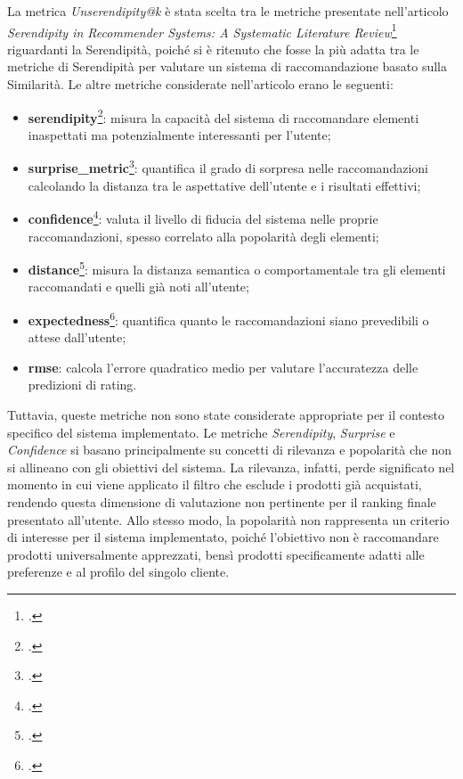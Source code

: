 La metrica \emph{Unserendipity@k} è stata scelta tra le metriche presentate nell'articolo \emph{Serendipity in Recommender Systems: A Systematic Literature Review}\footcite{article:serendipity-recommender-systems} riguardanti la Serendipità, poiché si è ritenuto che fosse la più adatta tra le metriche di Serendipità per valutare un sistema di raccomandazione basato sulla Similarità.
Le altre metriche considerate nell'articolo erano le seguenti:
\begin{itemize}
    \item \textbf{\gls{serendipity}}\footcite{site:serendipity_metric}: misura la capacità del sistema di raccomandare elementi inaspettati ma potenzialmente interessanti per l'utente;
    \item \textbf{\gls{surprise_metric}}\footcite{article:surprise_metric}: quantifica il grado di sorpresa nelle raccomandazioni calcolando la distanza tra le aspettative dell'utente e i risultati effettivi;
    \item \textbf{\gls{confidence}}\footcite{article:confidence_metric}: valuta il livello di fiducia del sistema nelle proprie raccomandazioni, spesso correlato alla popolarità degli elementi;
    \item \textbf{\gls{distance}}\footcite{site:distance_measures}: misura la distanza semantica o comportamentale tra gli elementi raccomandati e quelli già noti all'utente;
    \item \textbf{\gls{expectedness}}\footcite{article:expectedness}: quantifica quanto le raccomandazioni siano prevedibili o attese dall'utente;
    \item \textbf{\gls{rmse}}: calcola l'errore quadratico medio per valutare l'accuratezza delle predizioni di rating.
\end{itemize}

Tuttavia, queste metriche non sono state considerate appropriate per il contesto specifico del sistema implementato. Le metriche \emph{Serendipity}, \emph{Surprise} e \emph{Confidence} si basano principalmente su concetti di rilevanza e popolarità che non si allineano con gli obiettivi del sistema. La rilevanza, infatti, perde significato nel momento in cui viene applicato il filtro che esclude i prodotti già acquistati, rendendo questa dimensione di valutazione non pertinente per il ranking finale presentato all'utente. Allo stesso modo, la popolarità non rappresenta un criterio di interesse per il sistema implementato, poiché l'obiettivo non è raccomandare prodotti universalmente apprezzati, bensì prodotti specificamente adatti alle preferenze e al profilo del singolo cliente.

